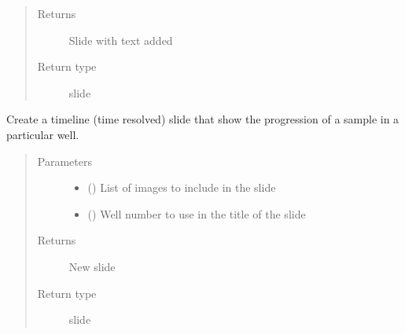 \documentclass[letterpaper,10pt,english]{sphinxmanual}
\begin{document}
\begin{fulllineitems}
\begin{fulllineitems}
\begin{quote}
\begin{description}
\begin{itemize}
\end{itemize}

\item[{Returns}] \leavevmode
Slide with text added

\item[{Return type}] \leavevmode
slide

\end{description}\end{quote}

\end{fulllineitems}


\begin{fulllineitems}
\label{\detokenize{polo.utils:polo.utils.io_utils.PptxWriter.add_timeline_slide}}
Create a timeline (time resolved) slide that
show the progression of a sample in a particular
well.
\begin{quote}\begin{description}
\item[{Parameters}] \leavevmode\begin{itemize}
\item {} 
 () \textendash{} List of images to include in the slide

\item {} 
 () \textendash{} Well number to use in the title of the slide

\end{itemize}

\item[{Returns}] \leavevmode
New slide

\item[{Return type}] \leavevmode
slide

\end{description}\end{quote}

\end{fulllineitems}



\end{fulllineitems}
\end{document}
